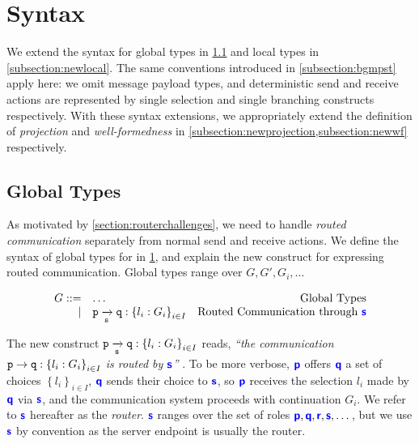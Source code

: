 \section{Syntax}
\label{section:syntax}

We extend the syntax for global types
in \cref{subsection:newglobal} and
local types in \cref{subsection:newlocal}.
The same conventions introduced in \cref{subsection:bgmpst}
apply here: 
we omit message payload types,
and deterministic send and receive actions
are represented by single selection and
single branching constructs respectively.
With these syntax extensions, we appropriately extend
the definition of \textit{projection} and 
\textit{well-formedness} in 
\cref{subsection:newprojection,subsection:newwf}
respectively.

\subsection{Global Types}
\label{subsection:newglobal}

As motivated by \cref{section:routerchallenges},
we need to handle \textit{routed communication} separately
from normal send and receive actions.
We define the syntax of global types for \newtheory 
in \cref{fig:newsyntaxglobal}, and explain the 
new construct for expressing routed communication.
Global types range over $G, G', G_i, \dots$

\begin{figure}[!h]
\doublespacing
\[
\begin{array}{rlr}
G ::= & \dots & \text{Global Types} \\
\mid & \groute{p}{q}{s}{l_i: G_i}{i \in I}
& \text{Routed Communication through $\role{s}$} \\
\end{array}
\]
\singlespacing
{}
\label{fig:newsyntaxglobal}
\end{figure}

The new construct $\groute{p}{q}{s}{l_i: G_i}{i \in I}$ reads, 
\textit{
``the communication $\gcomm{p}{q}{l_i: G_i}{i \in I}$
is routed by $\role{s}$''
}.
To be more verbose,
$\role{p}$ offers $\role{q}$ a set of choices
$\left\{l_i\right\}_{i \in I}$,
$\role{q}$ sends their choice to
$\role{s}$, so $\role{p}$ receives the
selection $l_i$ made by $\role{q}$ via $\role{s}$,
and the communication system proceeds with continuation $G_i$.
We refer to $\role{s}$ hereafter as the \textit{router}.
$\role{s}$ ranges over the set of roles 
$\role{p},\role{q},\role{r},\role{s},\dots$,
but we use $\role{s}$ by convention as the server endpoint
is usually the router.

